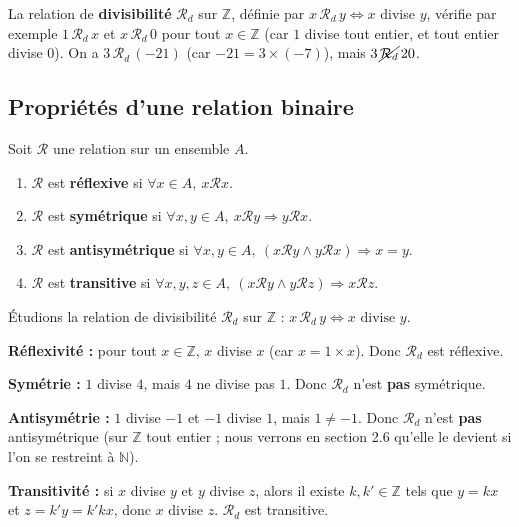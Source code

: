 \documentclass[a4paper,12pt,openany]{book}
\begin{document}
\begin{exemple}[2.6]
La relation de \textbf{divisibilité} $\mathcal{R}_d$ sur $\mathbb{Z}$, définie
par $x\,\mathcal{R}_d\,y \iff x$ divise $y$, vérifie par exemple
$1\,\mathcal{R}_d\,x$ et $x\,\mathcal{R}_d\,0$ pour tout $x \in \mathbb{Z}$
(car $1$ divise tout entier, et tout entier divise $0$). On a
$3 \,\mathcal{R}_d\, (-21)$ (car $-21=3\times(-7)$), mais
$3\,\cancel{\mathcal{R}_d}\,20$.
\end{exemple}

\subsection{Propriétés d'une relation binaire}


\begin{definition}
Soit $\mathcal{R}$ une relation sur un ensemble $A$.
\begin{enumerate}
  \item $\mathcal{R}$ est \textbf{réflexive} si $\forall x \in A,\ x\mathcal{R}x$.
  \item $\mathcal{R}$ est \textbf{symétrique} si $\forall x,y \in A,\
  x\mathcal{R}y \Rightarrow y\mathcal{R}x$.
  \item $\mathcal{R}$ est \textbf{antisymétrique} si $\forall x,y \in A,\
  (x\mathcal{R}y \wedge y\mathcal{R}x) \Rightarrow x=y$.
  \item $\mathcal{R}$ est \textbf{transitive} si $\forall x,y,z \in A,\
  (x\mathcal{R}y \wedge y\mathcal{R}z) \Rightarrow x\mathcal{R}z$.
\end{enumerate}
\end{definition}


\begin{exemple}
Étudions la relation de divisibilité $\mathcal{R}_d$ sur $\mathbb{Z}$ :
$x\,\mathcal{R}_d\,y \iff x \text{ divise } y$.

\textbf{Réflexivité :} pour tout $x\in\mathbb{Z}$, $x$ divise $x$ (car
$x = 1\times x$). Donc $\mathcal{R}_d$ est réflexive.

\textbf{Symétrie :} $1$ divise $4$, mais $4$ ne divise pas $1$. Donc
$\mathcal{R}_d$ n'est \textbf{pas} symétrique.

\textbf{Antisymétrie :} $1$ divise $-1$ et $-1$ divise $1$, mais $1 \neq -1$.
Donc $\mathcal{R}_d$ n'est \textbf{pas} antisymétrique (sur $\mathbb{Z}$ tout
entier ; nous verrons en section 2.6 qu'elle le devient si l'on se restreint
à $\mathbb{N}$).

\textbf{Transitivité :} si $x$ divise $y$ et $y$ divise $z$, alors il existe
$k,k'\in\mathbb{Z}$ tels que $y=kx$ et $z=k'y=k'kx$, donc $x$ divise $z$.
$\mathcal{R}_d$ est transitive.
\end{exemple}
\end{document}
